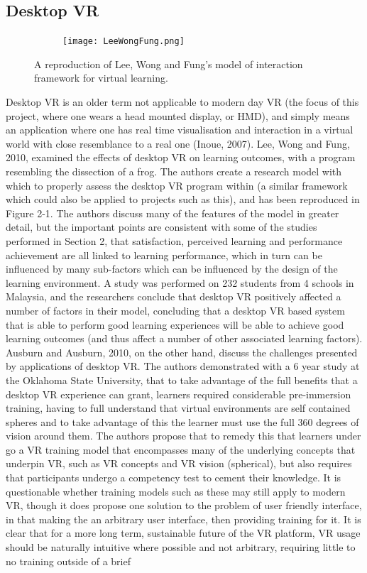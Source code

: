 \documentclass[11pt]{report}
\begin{document}
\subsection{Desktop VR}
\begin{figure}[h]
\centering
\begin{subfigure}[b]{0.7\textwidth}  
\texttt{[image: LeeWongFung.png]}
\end{subfigure}
\caption{A reproduction of Lee, Wong and Fung's\cite{Ai-LimLee2010} model of interaction framework for virtual learning.}
\end{figure}
Desktop VR is an older term not applicable to modern day VR (the focus of this project, where one wears a head mounted display, or HMD), and simply means an application where one has real time visualisation and interaction in a virtual world with close resemblance to a real one (Inoue, 2007\cite{Inoue2007}). Lee, Wong and Fung, 2010\cite{Ai-LimLee2010}, examined the effects of desktop VR on learning outcomes, with a program resembling the dissection of a frog. The authors create a research model with which to properly assess the desktop VR program within (a similar framework which could also be applied to projects such as this), and has been reproduced in Figure 2-1. The authors discuss many of the features of the model in greater detail, but the important points are consistent with some of the studies performed in Section 2, that satisfaction, perceived learning and performance achievement are all linked to learning performance, which in turn can be influenced by many sub-factors which can be influenced by the design of the learning environment. A study was performed on 232 students from 4 schools in Malaysia, and the researchers conclude that desktop VR positively affected a number of factors in their model, concluding that a desktop VR based system that is able to perform good learning experiences will be able to achieve good learning outcomes (and thus affect a number of other associated learning factors). Ausburn and Ausburn, 2010\cite{Ausburn2010}, on the other hand, discuss the challenges presented by applications of desktop VR. The authors demonstrated with a 6 year study at the Oklahoma State University, that to take advantage of the full benefits that a desktop VR experience can grant, learners required considerable pre-immersion training, having to full understand that virtual environments are self contained spheres and to take advantage of this the learner must use the full 360 degrees of vision around them. The authors propose that to remedy this that learners under go a VR training model that encompasses many of the underlying concepts that underpin VR, such as VR concepts and VR vision (spherical), but also requires that participants undergo a competency test to cement their knowledge. It is questionable whether training models such as these may still apply to modern VR, though it does propose one solution to the problem of user friendly interface, in that making the an arbitrary user interface, then providing training for it. It is clear that for a more long term, sustainable future of the VR platform, VR usage should be naturally intuitive where possible and not arbitrary, requiring little to no training outside of a brief 
\end{document}
